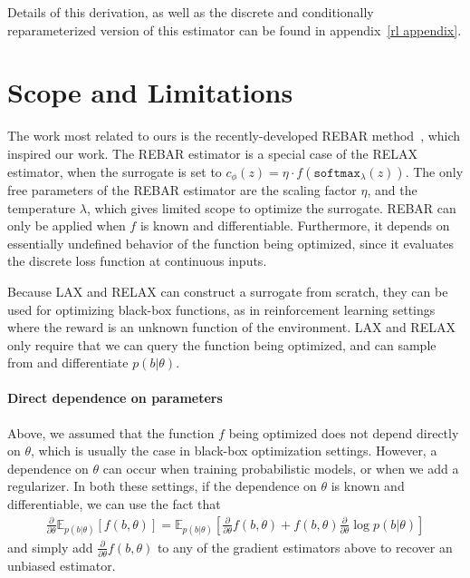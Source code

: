 \documentclass{article}
\newcommand{\E}{\mathbb{E}}
\newcommand{\PT}{\frac{\partial}{\partial \theta}}
\newcommand{\LAX}{{\textnormal{LAX}}}
\newcommand{\RELAX}{{\textnormal{RELAX}}}
\begin{document}
Details of this derivation, as well as the discrete and conditionally reparameterized version of this estimator can be found in appendix~\ref{rl appendix}.


\section{Scope and Limitations}
\label{limitations}
The work most related to ours is the recently-developed REBAR method~\citep{tucker2017rebar}, which inspired our work.
The REBAR estimator is a special case of the \RELAX{} estimator, when the surrogate is set to ${c_\phi(z) = \eta \cdot f(\texttt{softmax}_\lambda(z))}$.
The only free parameters of the REBAR estimator are the scaling factor $\eta$, and the temperature $\lambda$, which gives limited scope to optimize the surrogate.
REBAR can only be applied when $f$ is known and differentiable.
Furthermore, it depends on essentially undefined behavior of the function being optimized, since it evaluates the discrete loss function at continuous inputs.

Because \LAX{} and \RELAX{} can construct a surrogate from scratch, they can be used for optimizing black-box functions, as in reinforcement learning settings where the reward is an unknown function of the environment.
\LAX{} and \RELAX{} only require that we can query the function being optimized, and can sample from and differentiate $p(b|\theta)$.


\paragraph{Direct dependence on parameters}
Above, we assumed that the function $f$ being optimized does not depend directly on $\theta$, which is usually the case in black-box optimization settings.
However, a dependence on $\theta$ can occur when training probabilistic models, or when we add a regularizer. %
In both these settings, if the dependence on $\theta$ is known and differentiable, we can use the fact that
%
\begin{align}
\PT \E_{p(b|\theta)}[f(b, \theta)] = \E_{p(b|\theta)}\left[\PT f(b, \theta) + f(b, \theta)\PT \log p(b|\theta) \right]
\end{align}
%
and simply add $\PT f(b, \theta)$ to any of the gradient estimators above to recover an unbiased estimator.
\end{document}
